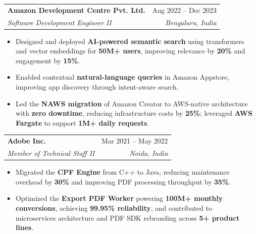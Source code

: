 \documentclass[a4paper,11pt]{article}
\makeatletter
\newcommand{\resumeItem}[1]{\item \normalsize{#1}}
\newcommand{\resumeSubheading}[4]{
    \vspace{-2pt}\item
    \begin{tabular*}{0.97\textwidth}[t]{l@{\extracolsep{\fill}}r}
    \textbf{#1} & #2 \\
    \textit{\small#3} & \textit{\small #4} \\
    \end{tabular*}\vspace{-7pt}
}
\newcommand{\resumeItemListStart}{\begin{itemize}[leftmargin=0.35in, label=\textbullet]} %
\newcommand{\resumeItemListEnd}{\end{itemize}\vspace{-5pt}}
\makeatother
\begin{document}
\resumeSubheading
{Amazon Development Centre Pvt. Ltd.}{Aug 2022 -- Dec 2023}
{Software Development Engineer II}{Bengaluru, India}
\resumeItemListStart
    \resumeItem{Designed and deployed \textbf{AI-powered semantic search} using transformers and vector embeddings for \textbf{50M+ users}, improving relevance by \textbf{20\%} and engagement by \textbf{15\%}.}
    \resumeItem{Enabled contextual \textbf{natural-language queries} in Amazon Appstore, improving app discovery through intent-aware search.}
    \resumeItem{Led the \textbf{NAWS migration} of Amazon Creator to AWS-native architecture with \textbf{zero downtime}, reducing infrastructure costs by \textbf{25\%}; leveraged \textbf{AWS Fargate} to support \textbf{1M+ daily requests}.}
\resumeItemListEnd


\resumeSubheading
{Adobe Inc.}{Mar 2021 -- May 2022}
{Member of Technical Staff II}{Noida, India}
\resumeItemListStart
    \resumeItem{Migrated the \textbf{CPF Engine} from C++ to Java, reducing maintenance overhead by \textbf{30\%} and improving PDF processing throughput by \textbf{35\%}.}
    \resumeItem{Optimized the \textbf{Export PDF Worker} powering \textbf{100M+ monthly conversions}, achieving \textbf{99.95\% reliability}, and contributed to microservices architecture and PDF SDK rebranding across \textbf{5+ product lines}.}
\resumeItemListEnd



\end{document}
